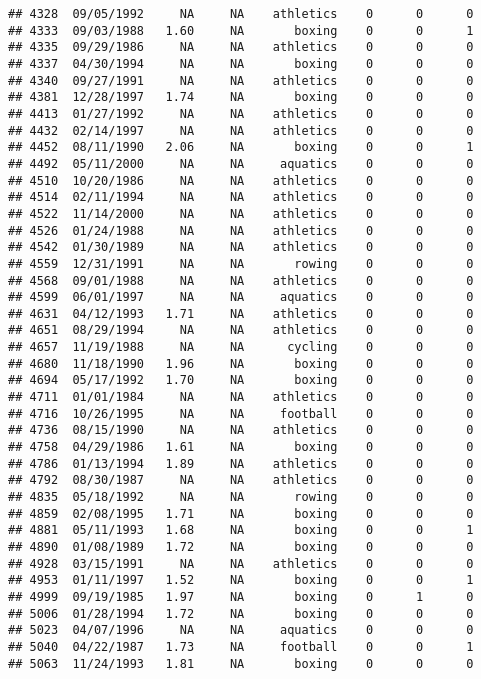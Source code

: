 \documentclass[]{article}
\begin{document}
\begin{verbatim}
## 4328  09/05/1992     NA     NA    athletics    0      0      0
## 4333  09/03/1988   1.60     NA       boxing    0      0      1
## 4335  09/29/1986     NA     NA    athletics    0      0      0
## 4337  04/30/1994     NA     NA       boxing    0      0      0
## 4340  09/27/1991     NA     NA    athletics    0      0      0
## 4381  12/28/1997   1.74     NA       boxing    0      0      0
## 4413  01/27/1992     NA     NA    athletics    0      0      0
## 4432  02/14/1997     NA     NA    athletics    0      0      0
## 4452  08/11/1990   2.06     NA       boxing    0      0      1
## 4492  05/11/2000     NA     NA     aquatics    0      0      0
## 4510  10/20/1986     NA     NA    athletics    0      0      0
## 4514  02/11/1994     NA     NA    athletics    0      0      0
## 4522  11/14/2000     NA     NA    athletics    0      0      0
## 4526  01/24/1988     NA     NA    athletics    0      0      0
## 4542  01/30/1989     NA     NA    athletics    0      0      0
## 4559  12/31/1991     NA     NA       rowing    0      0      0
## 4568  09/01/1988     NA     NA    athletics    0      0      0
## 4599  06/01/1997     NA     NA     aquatics    0      0      0
## 4631  04/12/1993   1.71     NA    athletics    0      0      0
## 4651  08/29/1994     NA     NA    athletics    0      0      0
## 4657  11/19/1988     NA     NA      cycling    0      0      0
## 4680  11/18/1990   1.96     NA       boxing    0      0      0
## 4694  05/17/1992   1.70     NA       boxing    0      0      0
## 4711  01/01/1984     NA     NA    athletics    0      0      0
## 4716  10/26/1995     NA     NA     football    0      0      0
## 4736  08/15/1990     NA     NA    athletics    0      0      0
## 4758  04/29/1986   1.61     NA       boxing    0      0      0
## 4786  01/13/1994   1.89     NA    athletics    0      0      0
## 4792  08/30/1987     NA     NA    athletics    0      0      0
## 4835  05/18/1992     NA     NA       rowing    0      0      0
## 4859  02/08/1995   1.71     NA       boxing    0      0      0
## 4881  05/11/1993   1.68     NA       boxing    0      0      1
## 4890  01/08/1989   1.72     NA       boxing    0      0      0
## 4928  03/15/1991     NA     NA    athletics    0      0      0
## 4953  01/11/1997   1.52     NA       boxing    0      0      1
## 4999  09/19/1985   1.97     NA       boxing    0      1      0
## 5006  01/28/1994   1.72     NA       boxing    0      0      0
## 5023  04/07/1996     NA     NA     aquatics    0      0      0
## 5040  04/22/1987   1.73     NA     football    0      0      1
## 5063  11/24/1993   1.81     NA       boxing    0      0      0

\end{verbatim}
\end{document}
